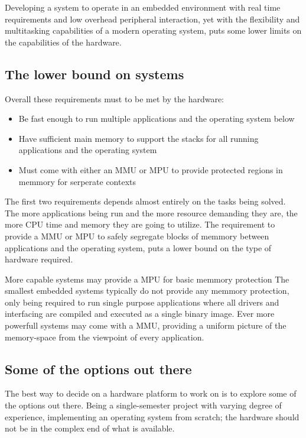 Developing a system to operate in an embedded environment with real time requirements
and low overhead peripheral interaction,
yet with the flexibility and multitasking capabilities of a modern operating system,
puts some lower limits on the capabilities of the hardware.

\subsection{The lower bound on systems}
Overall these requirements must to be met by the hardware:
\begin{itemize}
	\item Be fast enough to run multiple applications and the operating system below
	\item Have sufficient main memory to support the stacks for all running applications and the operating system
	\item Must come with either an MMU or MPU to provide protected regions in memmory for serperate contexts
\end{itemize}

The first two requirements depends almost entirely on the tasks being solved.
The more applications being run and the more resource demanding they are,
the more CPU time and memory they are going to utilize.
The requirement to provide a MMU or MPU to safely segregate blocks of memmory between applications and the operating system,
puts a lower bound on the type of hardware required.

More capable systems may provide a MPU for basic memmory protection
The smallest embedded systems typically do not provide any memmory protection,
only being required to run single purpose applications where all drivers and interfacing
are compiled and executed as a single binary image.
Ever more powerfull systems may come with a MMU,
providing a uniform picture of the memory-space from the viewpoint of every application.

\subsection{Some of the options out there}
The best way to decide on a hardware platform to work on is to explore some of the options out there.
Being a single-semester project with varying degree of experience,
implementing an operating system from scratch;
the hardware should not be in the complex end of what is available.

